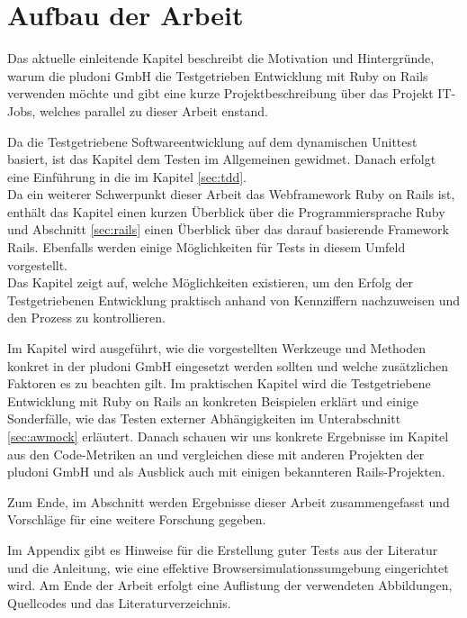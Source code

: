 \section{Aufbau der Arbeit}

Das aktuelle einleitende Kapitel beschreibt die Motivation und Hintergründe, warum die pludoni GmbH die Testgetrieben Entwicklung mit Ruby on Rails verwenden möchte und gibt eine kurze Projektbeschreibung über das Projekt IT-Jobs, welches parallel zu dieser Arbeit enstand.

Da die Testgetriebene Softwareentwicklung auf dem dynamischen Unittest basiert, ist das Kapitel  dem Testen im Allgemeinen gewidmet. Danach erfolgt eine Einführung in die \textit{} im Kapitel \ref{sec:tdd}. \\
Da ein weiterer Schwerpunkt dieser Arbeit das Webframework Ruby on Rails ist, enthält das Kapitel  einen kurzen Überblick über die Programmiersprache Ruby und Abschnitt \ref{sec:rails} einen Überblick über das darauf basierende Framework Rails. Ebenfalls werden einige Möglichkeiten für Tests in diesem Umfeld vorgestellt.\\
Das Kapitel  zeigt auf, welche Möglichkeiten existieren, um den Erfolg der Testgetriebenen Entwicklung praktisch anhand von Kennziffern nachzuweisen und den Prozess zu kontrollieren.

Im Kapitel  wird ausgeführt, wie die vorgestellten Werkzeuge und Methoden konkret in der pludoni GmbH eingesetzt werden sollten und welche zusätzlichen Faktoren es zu beachten gilt.
Im praktischen Kapitel  wird die Testgetriebene Entwicklung mit Ruby on Rails an konkreten Beispielen erklärt und einige Sonderfälle, wie das Testen externer Abhängigkeiten im Unterabschnitt \ref{sec:awmock} erläutert.
Danach schauen wir uns konkrete Ergebnisse im Kapitel  aus den Code-Metriken an und vergleichen diese mit anderen Projekten der pludoni GmbH und als Ausblick auch mit einigen bekannteren Rails-Projekten.

Zum Ende, im Abschnitt  werden Ergebnisse dieser Arbeit zusammengefasst und Vorschläge für eine weitere Forschung gegeben.

Im Appendix gibt es Hinweise für die Erstellung guter Tests aus der Literatur und die Anleitung, wie eine effektive Browsersimulationssumgebung eingerichtet wird. Am Ende der Arbeit erfolgt eine Auflistung der verwendeten Abbildungen, Quellcodes und das Literaturverzeichnis.

